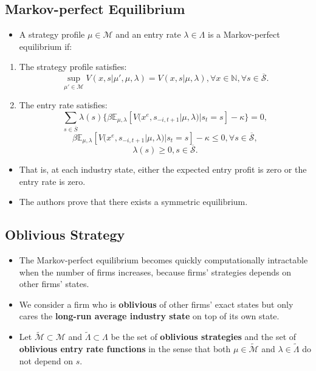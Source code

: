 \documentclass[]{book}
\providecommand{\tightlist}{%
  \setlength{\itemsep}{0pt}\setlength{\parskip}{0pt}}
\begin{document}
\subsection{Markov-perfect
Equilibrium}\label{markov-perfect-equilibrium-2}

\begin{itemize}
\tightlist
\item
  A strategy profile \(\mu \in \mathcal{M}\) and an entry rate
  \(\lambda \in \Lambda\) is a Markov-perfect equilibrium if:
\end{itemize}

\begin{enumerate}
\def\labelenumi{\arabic{enumi}.}
\tightlist
\item
  The strategy profile satisfies: \[
  \sup_{\mu' \in \mathcal{M}} V(x, s|\mu', \mu, \lambda) = V(x, s|\mu, \lambda), \forall x \in \mathbb{N}, \forall s \in \overline{\mathcal{S}}.
  \]
\item
  The entry rate satisfies: \[
  \sum_{s \in \overline{S}} \lambda(s) \{\beta \mathbb{E}_{\mu, \lambda}[V(x^e, s_{-i, t + 1}|\mu, \lambda)|s_t = s] - \kappa\}
   = 0,
   \] \[
   \beta \mathbb{E}_{\mu, \lambda}[V(x^e, s_{-i, t + 1}|\mu, \lambda)|s_t = s] - \kappa \le 0, \forall s \in \mathcal{\overline{S}},
   \] \[
   \lambda(s) \ge 0,s \in \mathcal{\overline{S}}.
   \]
\end{enumerate}

\begin{itemize}
\tightlist
\item
  That is, at each industry state, either the expected entry profit is
  zero or the entry rate is zero.
\item
  The authors prove that there exists a symmetric equilibrium.
\end{itemize}

\subsection{Oblivious Strategy}\label{oblivious-strategy}

\begin{itemize}
\tightlist
\item
  The Markov-perfect equilibrium becomes quickly computationally
  intractable when the number of firms increases, because firms'
  strategies depends on other firms' states.
\item
  We consider a firm who is \textbf{oblivious} of other firms' exact
  states but only cares the \textbf{long-run average industry state} on
  top of its own state.
\item
  Let \(\widetilde{\mathcal{M}} \subset \mathcal{M}\) and
  \(\widetilde{\Lambda} \subset \Lambda\) be the set of
  \textbf{oblivious strategies} and the set of \textbf{oblivious entry
  rate functions} in the sense that both
  \(\mu \in \widetilde{\mathcal{M}}\) and
  \(\lambda \in \widetilde{\Lambda}\) do not depend on \(s\).
\end{itemize}
\end{document}
